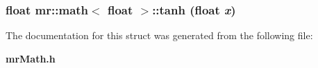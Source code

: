 \subsubsection{\setlength{\rightskip}{0pt plus 5cm}float {\bf mr::math}$<$ float $>$::tanh (float {\em x})\hspace{0.3cm}{\tt  [inline, static]}}\label{structmr_1_1math_3_01float_01_4_e9}




The documentation for this struct was generated from the following file:\begin{CompactItemize}
\item 
{\bf mr\-Math.h}\end{CompactItemize}
